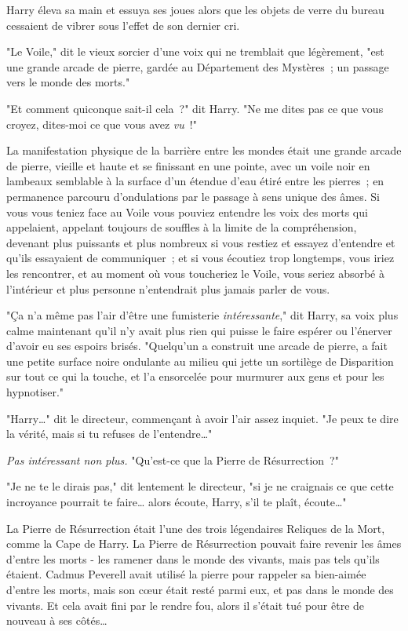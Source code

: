 Harry éleva sa main et essuya ses joues alors que les objets de verre du bureau cessaient de vibrer sous l'effet de son dernier cri.

"Le Voile," dit le vieux sorcier d'une voix qui ne tremblait que légèrement, "est une grande arcade de pierre, gardée au Département des Mystères~; un passage vers le monde des morts."

"Et comment quiconque sait-il cela~?" dit Harry. "Ne me dites pas ce que vous croyez, dites-moi ce que vous avez \emph{vu}~!"

La manifestation physique de la barrière entre les mondes était une grande arcade de pierre, vieille et haute et se finissant en une pointe, avec un voile noir en lambeaux semblable à la surface d'un étendue d'eau étiré entre les pierres~; en permanence parcouru d'ondulations par le passage à sens unique des âmes. Si vous vous teniez face au Voile vous pouviez entendre les voix des morts qui appelaient, appelant toujours de souffles à la limite de la compréhension, devenant plus puissants et plus nombreux si vous restiez et essayez d'entendre et qu'ils essayaient de communiquer~; et si vous écoutiez trop longtemps, vous iriez les rencontrer, et au moment où vous toucheriez le Voile, vous seriez absorbé à l'intérieur et plus personne n'entendrait plus jamais parler de vous.

"Ça n'a même pas l'air d'être une fumisterie \emph{intéressante}," dit Harry, sa voix plus calme maintenant qu'il n'y avait plus rien qui puisse le faire espérer ou l'énerver d'avoir eu ses espoirs brisés. "Quelqu'un a construit une arcade de pierre, a fait une petite surface noire ondulante au milieu qui jette un sortilège de Disparition sur tout ce qui la touche, et l'a ensorcelée pour murmurer aux gens et pour les hypnotiser."

"Harry…" dit le directeur, commençant à avoir l'air assez inquiet. "Je peux te dire la vérité, mais si tu refuses de l'entendre…"

\emph{Pas intéressant non plus.} "Qu'est-ce que la Pierre de Résurrection~?"

"Je ne te le dirais pas," dit lentement le directeur, "si je ne craignais ce que cette incroyance pourrait te faire… alors écoute, Harry, s'il te plaît, écoute…"

La Pierre de Résurrection était l'une des trois légendaires Reliques de la Mort, comme la Cape de Harry. La Pierre de Résurrection pouvait faire revenir les âmes d'entre les morts - les ramener dans le monde des vivants, mais pas tels qu'ils étaient. Cadmus Peverell avait utilisé la pierre pour rappeler sa bien-aimée d'entre les morts, mais son cœur était resté parmi eux, et pas dans le monde des vivants. Et cela avait fini par le rendre fou, alors il s'était tué pour être de nouveau à ses côtés…

